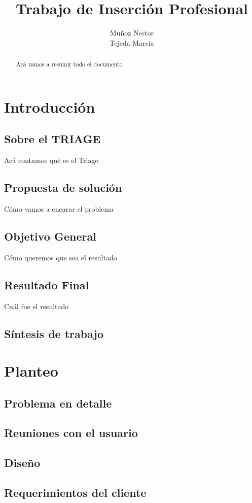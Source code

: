 \documentclass[a4paper,10pt]{article}
\title{Trabajo de Inserción Profesional}
\author{Muñoz Nestor \\ Tejeda Marcia}
\begin{document}
\maketitle
\newpage 
\begin{abstract}
Acá vamos a resumir todo el documento
\end{abstract}


\newpage 
\tableofcontents


\newpage 
\section{Introducción}
\subsection{Sobre el TRIAGE}
Acá contamos qué es el Triage
\subsection{Propuesta de solución}
Cómo vamos a encarar el problema
\subsection{Objetivo General}
Cómo queremos que sea el resultado
\subsection{Resultado Final}
Cuál fue el resultado
\subsection{Síntesis de trabajo}

\newpage 
\section{Planteo}
\subsection{Problema en detalle}
\subsection{Reuniones con el usuario}
\subsection{Diseño}
\subsection{Requerimientos del cliente}
\end{document}

